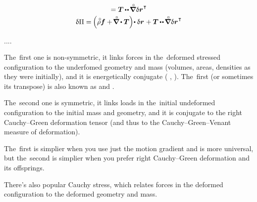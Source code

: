 \begin{equation*}
\begin{array}{c}
= \firstpiolakirchhoffstress \hspace{-0.1ex} \dotdotp \hspace{-0.2ex} \boldnablacircled \hspace{.1ex} \variation{\currentlocationvector}^{\hspace{.1ex}\T}
\\[.25em]
%
\variation{\potential}
= \hspace{-0.15ex} \left(^{\mathstrut} \hspace{-0.1ex} \mathcircabove{\rho} \bm{f} + \hspace{-0.25ex} \boldnablacircled \hspace{-0.1ex} \dotp \firstpiolakirchhoffstress \right) \hspace{-0.4ex} \dotp \variation{\currentlocationvector}
\hspace{.1ex}
+ \firstpiolakirchhoffstress \hspace{-0.1ex} \dotdotp \hspace{-0.2ex} \boldnablacircled \hspace{.1ex} \variation{\currentlocationvector}^{\hspace{.1ex}\T}
\end{array}
\end{equation*}

....

The~first one is non-symmetric, it links forces in the~deformed stressed configuration to the underfomed geometry and mass (volumes, areas, densities as they were initially), and it is energetically conjugate  ( ,  ).
The~first (or sometimes its transpose) is also known as  and .

The~second one is symmetric, it links loads in the~initial undeformed configuration to the initial mass and geometry, and it is conjugate to the right Cauchy\hbox{--}Green deformation tensor (and thus to the Cauchy\hbox{--}Green\hbox{--}Venant measure of deformation).

The~first is simplier when you use just the motion gradient and is more universal, but the~second is simplier when you prefer right Cauchy\hbox{--}Green deformation and its offsprings.

There’s also popular Cauchy stress, which relates forces in the deformed configuration to the deformed geometry and mass.

